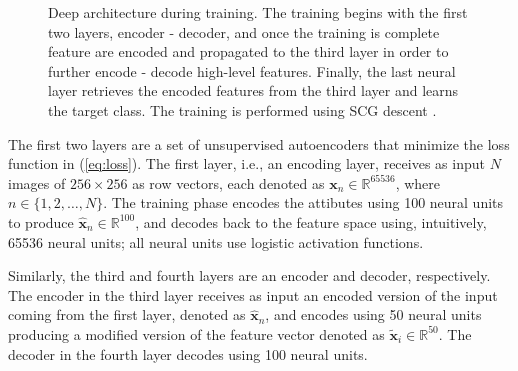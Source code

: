 \begin{figure}
\caption{Deep architecture during training. The training begins with the first
two layers, encoder - decoder, and once the training is complete feature are
encoded and propagated to the third layer in order to further
encode - decode high-level features. Finally, the last neural layer retrieves
the encoded features from the third layer and learns the target class. The
training is performed using SCG descent \cite{le2013building}.}
\label{fig:TrainingArchitecture}
\end{figure}
The first two layers are a set of unsupervised autoencoders that minimize the
loss function in (\ref{eq:loss}). The first layer, i.e., an encoding layer,
receives as input $N$ images of $256\times 256$ as row vectors, each denoted as 
$\mathbf{x}_n \in \mathbb{R}^{65536}$, where $n \in \{1,2, \dots, N\}$. The
training phase encodes the attibutes using 100 neural units to produce
$\mathbf{\hat{x}}_n \in \mathbb{R}^{100}$, and decodes back to
the feature space using, intuitively, 65536 neural units; all neural units use
logistic activation functions. 

Similarly, the third and fourth layers are an encoder and decoder,
respectively. The encoder in the third layer receives as input an encoded
version of the input coming from the first layer, denoted as
$\mathbf{\hat{x}}_n$, and encodes using 50 neural units producing a modified
version of the feature vector denoted as 
$\mathbf{\tilde{x}}_i \in \mathbb{R}^{50}$. 
The decoder in the fourth layer decodes using 100 neural units. 

